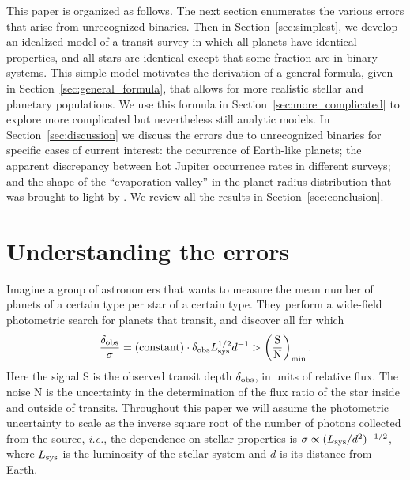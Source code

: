 \documentclass[12pt,modern]{aastex61}
\begin{document}
This paper is organized as follows.  The next section enumerates the
various errors that arise from unrecognized binaries.  Then in
Section~\ref{sec:simplest}, we develop an idealized model of a transit
survey in which all planets have identical properties, and all stars
are identical except that some fraction are in binary systems.  This
simple model motivates the derivation of a general formula, given in
Section~\ref{sec:general_formula}, that allows for more realistic
stellar and planetary populations.  We use this formula in
Section~\ref{sec:more_complicated} to explore more complicated but
nevertheless still analytic models.  In Section~\ref{sec:discussion}
we discuss the errors due to unrecognized binaries for specific cases
of current interest: the occurrence of Earth-like planets; the
apparent discrepancy between hot Jupiter occurrence rates in different
surveys; and the shape of the ``evaporation valley'' in the planet
radius distribution that was brought to light by
\citet{fulton_california-_2017}.  We review all the results in
Section~\ref{sec:conclusion}.


\section{Understanding the errors}
\label{sec:concept}

Imagine a group of astronomers that wants to measure the mean number of
planets of a certain type per star of a certain type.  They perform a
wide-field photometric search for planets that transit, and discover
all for which
\begin{equation}
\frac{\delta_{\rm obs}}{\sigma}
  = ({\rm constant}) \cdot \delta_{\rm obs} L_{\rm sys}^{1/2} d^{-1}
> \left(\frac{{\rm S}}{{\rm N}}\right)_{\rm min}.
\label{eq:S_N_thresh}
\end{equation}
Here the signal S is the observed transit depth $\delta_{\rm obs}$, in
units of relative flux.
The noise N is the uncertainty in the determination of the flux ratio
of the star inside and outside of transits.  Throughout this paper we
will assume the photometric uncertainty to scale as the inverse square
root of the number of photons collected from the source, {\it i.e.},
the dependence on stellar properties is $\sigma \propto (L_{\rm
sys}/d^2)^{-1/2}$, where $L_{\rm sys}$ is the luminosity of the
stellar system and $d$ is its distance from Earth.
\end{document}
